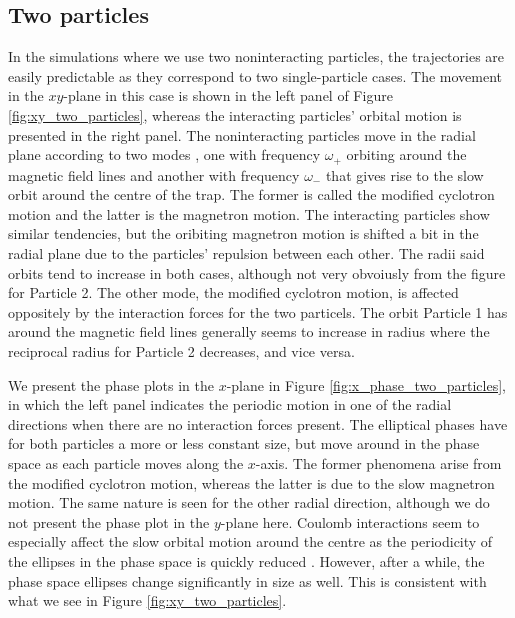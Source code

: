 \subsection{Two particles}


In the simulations where we use two noninteracting particles, the trajectories are easily predictable as they correspond to two single-particle cases. The movement in the $xy$-plane in this case is shown in the left panel of Figure \ref{fig:xy_two_particles}, whereas the interacting particles' orbital motion is presented in the right panel. The noninteracting particles move in the radial plane according to two modes , one with frequency $\omega_+$ orbiting around the magnetic field lines and another with frequency $\omega_-$ that gives rise to the slow orbit around the centre of the trap. The former is called the modified cyclotron motion and the latter is the magnetron motion. The interacting particles show similar tendencies, but the oribiting magnetron motion is shifted a bit in the radial plane due to the particles' repulsion between each other. The radii said orbits tend to increase in both cases, although not very obvoiusly from the figure for Particle 2. The other mode, the modified cyclotron motion, is affected oppositely by the interaction forces for the two particels. The orbit Particle 1 has around the magnetic field lines generally seems to increase in radius where the reciprocal radius for Particle 2 decreases, and vice versa.


We present the phase plots in the $x$-plane in Figure \ref{fig:x_phase_two_particles}, in which the left panel indicates the periodic motion in one of the radial directions when there are no interaction forces present. The elliptical phases have for both particles a more or less constant size, but move around in the phase space as each particle moves along the $x$-axis. The former phenomena arise from the modified cyclotron motion, whereas the latter is due to the slow magnetron motion. The same nature is seen for the other radial direction, although we do not present the phase plot in the $y$-plane here. Coulomb interactions seem to especially affect the slow orbital motion around the centre as the periodicity of the ellipses in the phase space is quickly reduced . However, after a while, the phase space ellipses change significantly in size as well. This is consistent with what we see in Figure \ref{fig:xy_two_particles}.  

